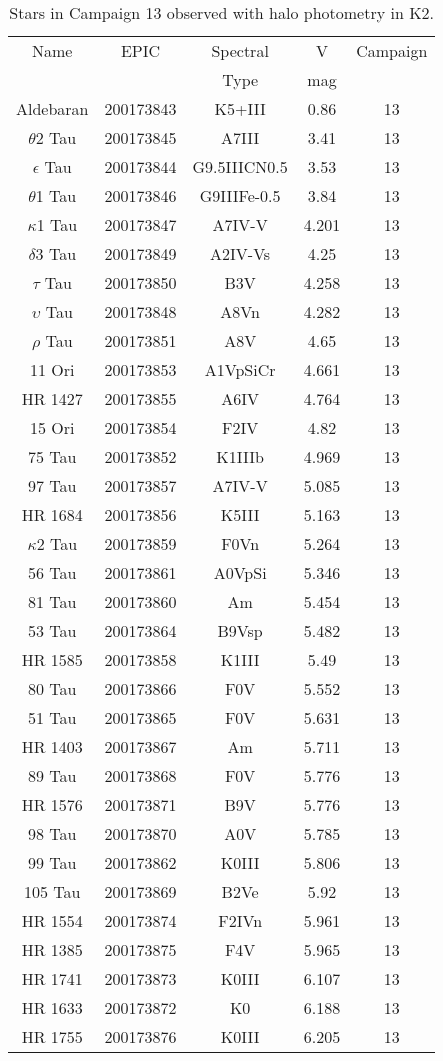 \begin{table*}
\caption{Stars in Campaign 13 observed with halo photometry in K2.\label{table_3}}
\begin{tabular}{ccccc}
\hline \hline
Name & EPIC & Spectral & V & Campaign \\
 &  & Type & mag &  \\
\hline
Aldebaran & 200173843 & K5+III & 0.86 & 13 \\
$\theta$2 Tau & 200173845 & A7III & 3.41 & 13 \\
$\epsilon$ Tau & 200173844 & G9.5IIICN0.5 & 3.53 & 13 \\
$\theta$1 Tau & 200173846 & G9IIIFe-0.5 & 3.84 & 13 \\
$\kappa$1 Tau & 200173847 & A7IV-V & 4.201 & 13 \\
$\delta$3 Tau & 200173849 & A2IV-Vs & 4.25 & 13 \\
$\tau$ Tau & 200173850 & B3V & 4.258 & 13 \\
$\upsilon$ Tau & 200173848 & A8Vn & 4.282 & 13 \\
$\rho$ Tau & 200173851 & A8V & 4.65 & 13 \\
11 Ori & 200173853 & A1VpSiCr & 4.661 & 13 \\
HR 1427 & 200173855 & A6IV & 4.764 & 13 \\
15 Ori & 200173854 & F2IV & 4.82 & 13 \\
75 Tau & 200173852 & K1IIIb & 4.969 & 13 \\
97 Tau & 200173857 & A7IV-V & 5.085 & 13 \\
HR 1684 & 200173856 & K5III & 5.163 & 13 \\
$\kappa$2 Tau & 200173859 & F0Vn & 5.264 & 13 \\
56 Tau & 200173861 & A0VpSi & 5.346 & 13 \\
81 Tau & 200173860 & Am & 5.454 & 13 \\
53 Tau & 200173864 & B9Vsp & 5.482 & 13 \\
HR 1585 & 200173858 & K1III & 5.49 & 13 \\
80 Tau & 200173866 & F0V & 5.552 & 13 \\
51 Tau & 200173865 & F0V & 5.631 & 13 \\
HR 1403 & 200173867 & Am & 5.711 & 13 \\
89 Tau & 200173868 & F0V & 5.776 & 13 \\
HR 1576 & 200173871 & B9V & 5.776 & 13 \\
98 Tau & 200173870 & A0V & 5.785 & 13 \\
99 Tau & 200173862 & K0III & 5.806 & 13 \\
105 Tau & 200173869 & B2Ve & 5.92 & 13 \\
HR 1554 & 200173874 & F2IVn & 5.961 & 13 \\
HR 1385 & 200173875 & F4V & 5.965 & 13 \\
HR 1741 & 200173873 & K0III & 6.107 & 13 \\
HR 1633 & 200173872 & K0 & 6.188 & 13 \\
HR 1755 & 200173876 & K0III & 6.205 & 13 \\
\hline
\end{tabular}
\end{table*}

